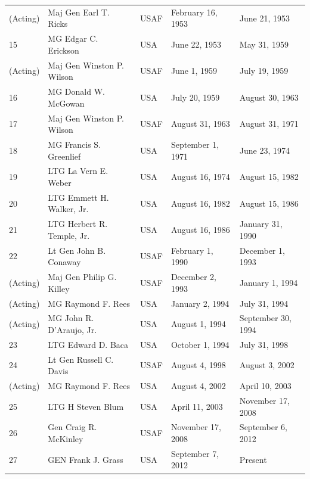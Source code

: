 \documentclass{article}
\begin{document}
\begin{tabular}{lllll}
(Acting) & Maj Gen Earl T. Ricks & USAF & February 16, 1953 & June 21, 1953 \\
15 & MG Edgar C. Erickson & USA & June 22, 1953 & May 31, 1959 \\
(Acting) & Maj Gen Winston P. Wilson & USAF & June 1, 1959 & July 19, 1959 \\
16 & MG Donald W. McGowan & USA & July 20, 1959 & August 30, 1963 \\
17 & Maj Gen Winston P. Wilson & USAF & August 31, 1963 & August 31, 1971 \\
18 & MG Francis S. Greenlief & USA & September 1, 1971 & June 23, 1974 \\
19 & LTG La Vern E. Weber & USA & August 16, 1974 & August 15, 1982 \\
20 & LTG Emmett H. Walker, Jr. & USA & August 16, 1982 & August 15, 1986 \\
21 & LTG Herbert R. Temple, Jr. & USA & August 16, 1986 & January 31, 1990 \\
22 & Lt Gen John B. Conaway & USAF & February 1, 1990 & December 1, 1993 \\
(Acting) & Maj Gen Philip G. Killey & USAF & December 2, 1993 & January 1, 1994 \\
(Acting) & MG Raymond F. Rees & USA & January 2, 1994 & July 31, 1994 \\
(Acting) & MG John R. D'Araujo, Jr. & USA & August 1, 1994 & September 30, 1994 \\
23 & LTG Edward D. Baca & USA & October 1, 1994 & July 31, 1998 \\
24 & Lt Gen Russell C. Davis & USAF & August 4, 1998 & August 3, 2002 \\
(Acting) & MG Raymond F. Rees & USA & August 4, 2002 & April 10, 2003 \\
25 & LTG H Steven Blum & USA & April 11, 2003 & November 17, 2008 \\
26 & Gen Craig R. McKinley & USAF & November 17, 2008 & September 6, 2012 \\
27 & GEN Frank J. Grass & USA & September 7, 2012 & Present \\
\bottomrule
\end{tabular}
\end{document}
